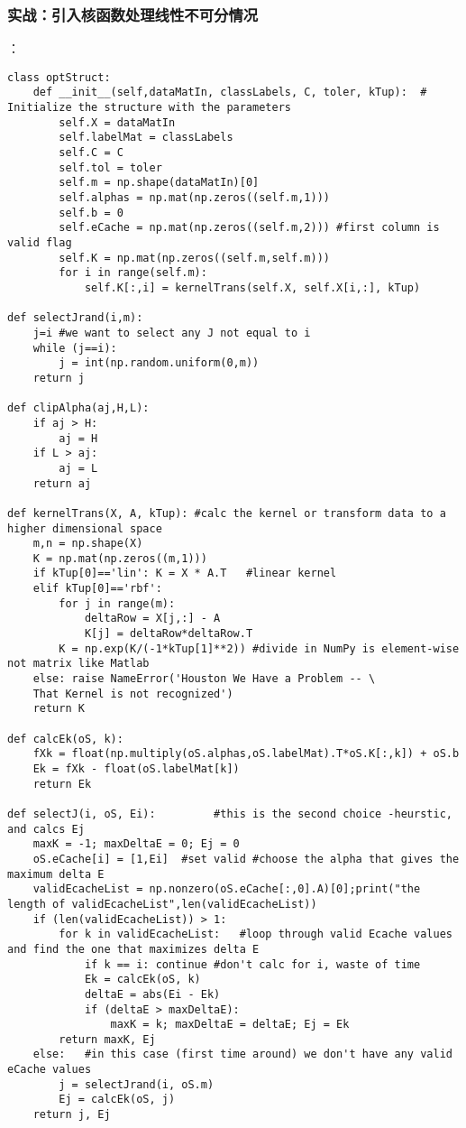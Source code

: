 \subsubsection{实战：引入核函数处理线性不可分情况}
：
\begin{lstlisting}
class optStruct:
    def __init__(self,dataMatIn, classLabels, C, toler, kTup):  # Initialize the structure with the parameters
        self.X = dataMatIn
        self.labelMat = classLabels
        self.C = C
        self.tol = toler
        self.m = np.shape(dataMatIn)[0]
        self.alphas = np.mat(np.zeros((self.m,1)))
        self.b = 0
        self.eCache = np.mat(np.zeros((self.m,2))) #first column is valid flag
        self.K = np.mat(np.zeros((self.m,self.m)))
        for i in range(self.m):
            self.K[:,i] = kernelTrans(self.X, self.X[i,:], kTup)

def selectJrand(i,m):
    j=i #we want to select any J not equal to i
    while (j==i):
        j = int(np.random.uniform(0,m))
    return j

def clipAlpha(aj,H,L):
    if aj > H:
        aj = H
    if L > aj:
        aj = L
    return aj

def kernelTrans(X, A, kTup): #calc the kernel or transform data to a higher dimensional space
    m,n = np.shape(X)
    K = np.mat(np.zeros((m,1)))
    if kTup[0]=='lin': K = X * A.T   #linear kernel
    elif kTup[0]=='rbf':
        for j in range(m):
            deltaRow = X[j,:] - A
            K[j] = deltaRow*deltaRow.T
        K = np.exp(K/(-1*kTup[1]**2)) #divide in NumPy is element-wise not matrix like Matlab
    else: raise NameError('Houston We Have a Problem -- \
    That Kernel is not recognized')
    return K

def calcEk(oS, k):
    fXk = float(np.multiply(oS.alphas,oS.labelMat).T*oS.K[:,k]) + oS.b
    Ek = fXk - float(oS.labelMat[k])
    return Ek

def selectJ(i, oS, Ei):         #this is the second choice -heurstic, and calcs Ej
    maxK = -1; maxDeltaE = 0; Ej = 0
    oS.eCache[i] = [1,Ei]  #set valid #choose the alpha that gives the maximum delta E
    validEcacheList = np.nonzero(oS.eCache[:,0].A)[0];print("the length of validEcacheList",len(validEcacheList))
    if (len(validEcacheList)) > 1:
        for k in validEcacheList:   #loop through valid Ecache values and find the one that maximizes delta E
            if k == i: continue #don't calc for i, waste of time
            Ek = calcEk(oS, k)
            deltaE = abs(Ei - Ek)
            if (deltaE > maxDeltaE):
                maxK = k; maxDeltaE = deltaE; Ej = Ek
        return maxK, Ej
    else:   #in this case (first time around) we don't have any valid eCache values
        j = selectJrand(i, oS.m)
        Ej = calcEk(oS, j)
    return j, Ej


\end{lstlisting}
